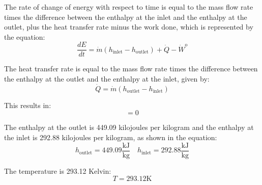 The rate of change of energy with respect to time is equal to the mass flow rate times the difference between the enthalpy at the inlet and the enthalpy at the outlet, plus the heat transfer rate minus the work done, which is represented by the equation:
\[ \frac{dE}{dt} = \dot{m} (h_{\text{inlet}} - h_{\text{outlet}}) + \dot{Q} - \dot{W}^{\text{o}} \]

The heat transfer rate is equal to the mass flow rate times the difference between the enthalpy at the outlet and the enthalpy at the inlet, given by:
\[ \dot{Q} = \dot{m} (h_{\text{outlet}} - h_{\text{inlet}}) \]

This results in:
\[ = 0 \]

The enthalpy at the outlet is 449.09 kilojoules per kilogram and the enthalpy at the inlet is 292.88 kilojoules per kilogram, as shown in the equation:
\[ h_{\text{outlet}} = 449.09 \frac{\text{kJ}}{\text{kg}} \quad h_{\text{inlet}} = 292.88 \frac{\text{kJ}}{\text{kg}} \]

The temperature is 293.12 Kelvin:
\[ T = 293.12 \text{K} \]